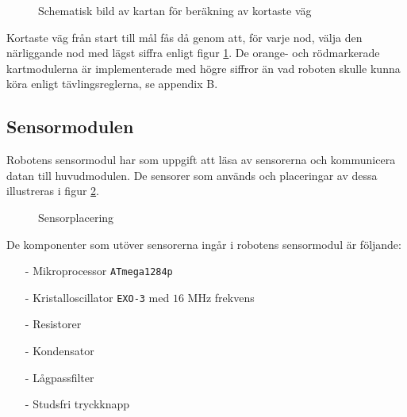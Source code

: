 \documentclass[11pt]{article}
\begin{document}
\begin{flushleft}
\begin{figure}[htbp]
\centering
\noindent\resizebox{0.7\linewidth}{!}{
	}
	\caption{Schematisk bild av kartan för beräkning av kortaste väg}	\label{path}
\end{figure}


Kortaste väg från start till mål fås då genom att, för varje nod, välja den närliggande nod med lägst siffra enligt figur \ref{path}. De orange- och rödmarkerade kartmodulerna är implementerade med högre siffror än vad roboten skulle kunna köra  enligt tävlingsreglerna, se appendix B.

\pagebreak

\subsection{Sensormodulen}
Robotens sensormodul har som uppgift att läsa av sensorerna och kommunicera datan till huvudmodulen. De sensorer som används och placeringar av dessa illustreras i figur \ref{sensors}.
\newline

\begin{figure}[htbp]
\centering
\noindent\resizebox{.8\textwidth}{!}{
		}
	\caption{Sensorplacering \label{sensors}}
\end{figure}

De komponenter som utöver sensorerna ingår i robotens sensormodul är följande:
\begin{itemize}
  \item[-] Mikroprocessor \verb+ATmega1284p+
  \item[-] Kristalloscillator \verb+EXO-3+ med $16$ MHz frekvens
  \item[-] Resistorer
  \item[-] Kondensator
  \item[-] Lågpassfilter
  \item[-] Studsfri tryckknapp
\end{itemize}


\end{flushleft}
\end{document}
